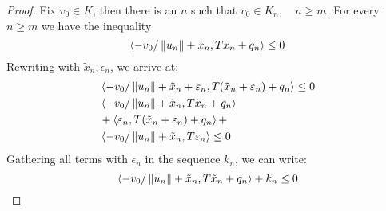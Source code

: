 \begin{proof}
Fix $v_0 \in K$, then there is an $n$ such that $v_0 \in K_n,\quad n \geq m$. For every $n \geq m$ we have the inequality
\begin{equation}
	\left \langle -v_0/\left \Vert u_n \right \Vert+x_n,Tx_n+q_n \right \rangle \leq 0
\end{equation}
Rewriting with $\tilde{x}_n, \epsilon_n$, we arrive at:
\begin{align*}
	&\left \langle -v_0/\left \Vert u_n \right \Vert+\tilde{x}_n+\varepsilon_n,T(\tilde{x}_n+\varepsilon_n)+q_n \right \rangle \leq 0 \\
	&\left \langle -v_0/\left \Vert u_n \right \Vert+\tilde{x}_n,T\tilde{x}_n+q_n \right \rangle \\
	&+\left \langle \varepsilon_n,T(\tilde{x}_n+\varepsilon_n)+q_n \right \rangle+\\
  &\left \langle -v_0/\left \Vert u_n \right \Vert+\tilde{x}_n,T\varepsilon_n \right \rangle \leq 0
\end{align*}
Gathering all terms with $\epsilon_n$ in the sequence $k_n$, we can write:
\begin{equation}
	\left \langle -v_0/\left \Vert u_n \right \Vert+\tilde{x}_n,T\tilde{x}_n+q_n \right \rangle+k_n \leq 0
\end{equation}



\end{proof}

